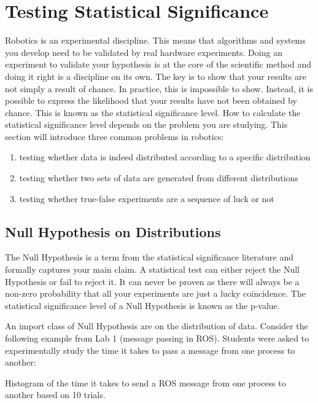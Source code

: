\section{Testing Statistical Significance}\label{sec:stattest}
Robotics is an experimental discipline. This means that algorithms and systems you develop need to be validated by real hardware experiments. Doing an experiment to validate your hypothesis is at the core of the scientific method and doing it right is a discipline on its own. The key is to show that your results are not simply a result of chance. In practice, this is impossible to show. Instead, it is possible to express the likelihood that your results have not been obtained by chance. This is known as the statistical significance level. How to calculate the statistical significance level depends on the problem you are studying. This section will introduce three common problems in robotics:

\begin{enumerate}
\item testing whether data is indeed distributed according to a specific distribution
\item testing whether two sets of data are generated from different distributions
\item testing whether true-false experiments are a sequence of luck or not
\end{enumerate}

\subsection{Null Hypothesis on Distributions}
The Null Hypothesis is a term from the statistical significance literature and formally captures your main claim. A statistical test can either reject the Null Hypothesis or fail to reject it. It can never be proven as there will always be a non-zero probability that all your experiments are just a lucky coincidence. The statistical significance level of a Null Hypothesis is known as the p-value.

An import class of Null Hypothesis are on the distribution of data. Consider the following example from Lab 1 (message passing in ROS). Students were asked to experimentally study the time it takes to pass a message from one process to another:

\begin{mdframed}
Histogram of the time it takes to send a ROS message from one process to another based on 10 trials.
\end{mdframed}

